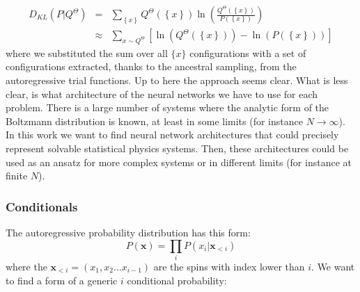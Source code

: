 \documentclass{article}
\begin{document}
\begin{eqnarray*}
D_{KL}\left(P|Q^{\Theta}\right) & = & \sum_{\left\{ x\right\} }Q^{\Theta}\left(\left\{ x\right\} \right)\ln\left(\frac{Q^{\Theta}\left(\left\{ x\right\} \right)}{P\left(\left\{ x\right\} \right)}\right)\\
 & \approx & \sum_{x\sim Q^{\Theta}}\left[\ln\left(Q^{\Theta}\left(\left\{ x\right\} \right)\right)-\ln\left(P\left(\left\{ x\right\} \right)\right)\right]
\end{eqnarray*}
where we substituted the sum over all $\{x\}$ configurations with a set of configurations extracted, thanks to the ancestral sampling, from the autoregressive trial functions.
Up to here the approach seems clear. 
What is less clear, is what architecture of the neural networks we have to use for each problem.
There is a large number of systems where the analytic form of the Boltzmann distribution is known, at least in some limits (for instance $N\rightarrow \infty$). 
In this work we want to find neural network architectures that could precisely represent solvable statistical physics systems. 
Then, these architectures could be used as an ansatz for more complex systems or in different limits (for instance at finite $N$).


\subsubsection{Conditionals}
The autoregressive probability distribution has this form:
\begin{equation}
P\left(\mathbf{x}\right)=\prod_{i}P\left(x_{i}|\mathbf{x}_{<i}\right)
\end{equation}
where the $\mathbf{x}_{<i}=\left(x_{1},x_{2}\dots x_{i-1}\right)$
are the spins with index lower than $i$. We want to find a form of a generic $i$ conditional probability: 
\end{document}
